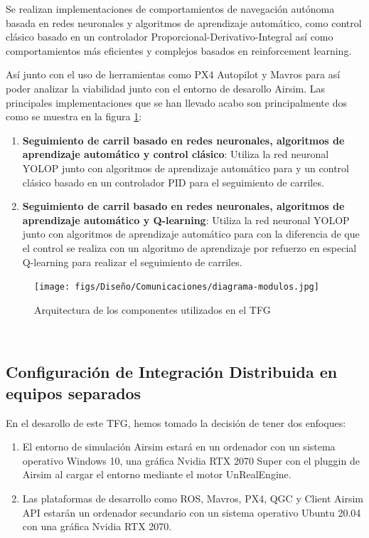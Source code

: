 Se realizan implementaciones de comportamientos de navegación autónoma basada en redes neuronales y algoritmos de aprendizaje automático, como control clásico basado en 
un controlador Proporcional-Derivativo-Integral así como comportamientos más eficientes y complejos basados en reinforcement learning.

Así junto con el uso de herramientas como PX4 Autopilot y Mavros para así poder analizar la viabilidad junto con el entorno de desarollo Airsim. Las principales implementaciones que se han 
llevado acabo son principalmente dos como se muestra en la figura \ref{fig:infraestructura}:

\begin{enumerate}
  \item \textbf{Seguimiento de carril basado en redes neuronales, algoritmos de aprendizaje automático y control clásico}: Utiliza la red neuronal YOLOP junto con algoritmos de aprendizaje automático para 
   y un control clásico basado en un controlador PID para el seguimiento de carriles.
  \item \textbf{Seguimiento de carril basado en redes neuronales, algoritmos de aprendizaje automático y Q-learning}: Utiliza la red neuronal YOLOP junto con algoritmos de aprendizaje automático para 
  con la diferencia de que el control se realiza con un algoritmo de aprendizaje por refuerzo en especial Q-learning para realizar el seguimiento de carriles.
\end{enumerate}

\begin{figure} [H]
    \begin{center}
      \texttt{[image: figs/Diseño/Comunicaciones/diagrama-modulos.jpg]}
    \end{center}
    \caption{Arquitectura de los componentes utilizados en el TFG}
    \label{fig:infraestructura}
  \end{figure}\

\subsection{Configuración de Integración Distribuida en equipos separados}
En el desarollo de este TFG, hemos tomado la decisión de tener dos enfoques:

\begin{enumerate}
  \item El entorno de simulación Airsim estará en un ordenador con un sistema operativo Windows 10, una gráfica Nvidia RTX 2070 Super con el pluggin de 
  Airsim al cargar el entorno mediante el motor UnRealEngine.
  \item Las plataformas de desarrollo como ROS, Mavros, PX4, QGC y Client Airsim API estarán un  ordenador secundario con un sistema operativo Ubuntu 20.04 con una gráfica Nvidia RTX
  2070.
\end{enumerate}

